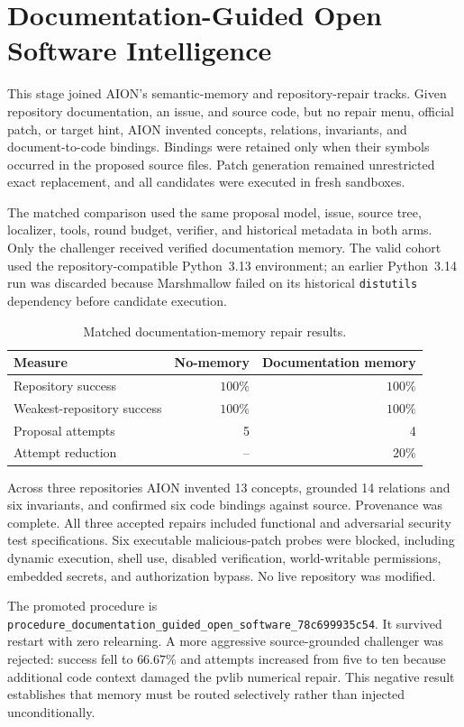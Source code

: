 \section{Documentation-Guided Open Software Intelligence}
\label{sec:documentation-guided-open-software}

This stage joined AION's semantic-memory and repository-repair tracks.  Given
repository documentation, an issue, and source code, but no repair menu,
official patch, or target hint, AION invented concepts, relations, invariants,
and document-to-code bindings.  Bindings were retained only when their symbols
occurred in the proposed source files.  Patch generation remained unrestricted
exact replacement, and all candidates were executed in fresh sandboxes.

The matched comparison used the same proposal model, issue, source tree,
localizer, tools, round budget, verifier, and historical metadata in both arms.
Only the challenger received verified documentation memory.  The valid cohort
used the repository-compatible Python~3.13 environment; an earlier Python~3.14
run was discarded because Marshmallow failed on its historical
\texttt{distutils} dependency before candidate execution.

\begin{table}[htbp]
\centering
\caption{Matched documentation-memory repair results.}
\begin{tabular}{lrr}
\hline
Measure & No-memory & Documentation memory \\
\hline
Repository success & $100\%$ & $100\%$ \\
Weakest-repository success & $100\%$ & $100\%$ \\
Proposal attempts & 5 & 4 \\
Attempt reduction & -- & $20\%$ \\
\hline
\end{tabular}
\end{table}

Across three repositories AION invented 13 concepts, grounded 14 relations and
six invariants, and confirmed six code bindings against source.  Provenance was
complete.  All three accepted repairs included functional and adversarial
security test specifications.  Six executable malicious-patch probes were
blocked, including dynamic execution, shell use, disabled verification,
world-writable permissions, embedded secrets, and authorization bypass.  No
live repository was modified.

The promoted procedure is
\texttt{procedure\_documentation\_guided\_open\_software\_78c699935c54}.
It survived restart with zero relearning.  A more aggressive source-grounded
challenger was rejected: success fell to $66.67\%$ and attempts increased from
five to ten because additional code context damaged the pvlib numerical repair.
This negative result establishes that memory must be routed selectively rather
than injected unconditionally.

